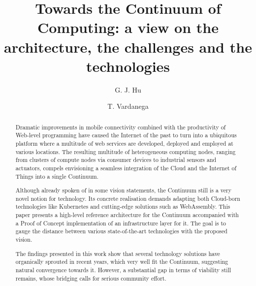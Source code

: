 \documentclass{elsarticle}
\begin{document}
\begin{frontmatter}


\title{Towards the Continuum of Computing: a view on the architecture, the challenges and the technologies}

\author[1]{G. J. Hu}
\author[1]{T. Vardanega}
\address[1]{Department of Mathematics, University of Padova, Italy}

\begin{abstract}
Dramatic improvements in mobile connectivity combined with the productivity of Web-level programming have caused the Internet of the past to turn into a ubiquitous platform where a multitude of web services are developed, deployed and employed at various locations. The resulting multitude of heterogeneous computing nodes, ranging from clusters of compute nodes via consumer devices to industrial sensors and actuators, compels envisioning a seamless integration of the Cloud and the Internet of Things into a single Continuum.\par
Although already spoken of in some vision statements, the Continuum still is a very novel notion for technology. Its concrete realisation demands adapting both Cloud-born technologies like Kubernetes and cutting-edge solutions such as WebAssembly. This paper presents a high-level reference architecture for the Continuum accompanied with a Proof of Concept implementation of an infrastructure layer for it. The goal is to gauge the distance between various state-of-the-art technologies with the proposed vision.\par
The findings presented in this work show that several technology solutions have organically sprouted in recent years, which very well fit the Continuum, suggesting natural convergence towards it. However, a substantial gap in terms of viability still remains, whose bridging calls for serious community effort.
\end{abstract}



\end{frontmatter}
\end{document}
